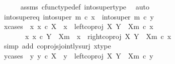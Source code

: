 \begin{isabellebody}
\ \ \ \ \isamarkupfalse%
\ assms\ cfunc{\isacharunderscore}{\kern0pt}type{\isacharunderscore}{\kern0pt}def\ into{\isacharunderscore}{\kern0pt}super{\isacharunderscore}{\kern0pt}type\ \isamarkupfalse%
\ auto\isanewline
\isanewline
\ \ \isamarkupfalse%
\ into{\isacharunderscore}{\kern0pt}super{\isacharunderscore}{\kern0pt}eq{\isacharcolon}{\kern0pt}\ {\isachardoublequoteopen}into{\isacharunderscore}{\kern0pt}super\ m\ {\isasymcirc}\isactrlsub c\ x\ {\isacharequal}{\kern0pt}\ into{\isacharunderscore}{\kern0pt}super\ m\ {\isasymcirc}\isactrlsub c\ y{\isachardoublequoteclose}\isanewline
\isanewline
\ \ \isamarkupfalse%
\ x{\isacharunderscore}{\kern0pt}cases{\isacharcolon}{\kern0pt}\ {\isachardoublequoteopen}{\isacharparenleft}{\kern0pt}{\isasymexists}\ x{\isacharprime}{\kern0pt}{\isachardot}{\kern0pt}\ x{\isacharprime}{\kern0pt}\ {\isasymin}\isactrlsub c\ X\ {\isasymand}\ x\ {\isacharequal}{\kern0pt}\ left{\isacharunderscore}{\kern0pt}coproj\ X\ {\isacharparenleft}{\kern0pt}Y\ {\isasymsetminus}\ {\isacharparenleft}{\kern0pt}X{\isacharcomma}{\kern0pt}m{\isacharparenright}{\kern0pt}{\isacharparenright}{\kern0pt}\ {\isasymcirc}\isactrlsub c\ x{\isacharprime}{\kern0pt}{\isacharparenright}{\kern0pt}\isanewline
\ \ \ \ {\isasymor}\ \ {\isacharparenleft}{\kern0pt}{\isasymexists}\ x{\isacharprime}{\kern0pt}{\isachardot}{\kern0pt}\ x{\isacharprime}{\kern0pt}\ {\isasymin}\isactrlsub c\ Y\ {\isasymsetminus}\ {\isacharparenleft}{\kern0pt}X{\isacharcomma}{\kern0pt}m{\isacharparenright}{\kern0pt}\ {\isasymand}\ x\ {\isacharequal}{\kern0pt}\ right{\isacharunderscore}{\kern0pt}coproj\ X\ {\isacharparenleft}{\kern0pt}Y\ {\isasymsetminus}\ {\isacharparenleft}{\kern0pt}X{\isacharcomma}{\kern0pt}m{\isacharparenright}{\kern0pt}{\isacharparenright}{\kern0pt}\ {\isasymcirc}\isactrlsub c\ x{\isacharprime}{\kern0pt}{\isacharparenright}{\kern0pt}{\isachardoublequoteclose}\isanewline
\ \ \ \ \isamarkupfalse%
\ {\isacharparenleft}{\kern0pt}simp\ add{\isacharcolon}{\kern0pt}\ coprojs{\isacharunderscore}{\kern0pt}jointly{\isacharunderscore}{\kern0pt}surj\ x{\isacharunderscore}{\kern0pt}type{\isacharparenright}{\kern0pt}\isanewline
\isanewline
\ \ \isamarkupfalse%
\ y{\isacharunderscore}{\kern0pt}cases{\isacharcolon}{\kern0pt}\ {\isachardoublequoteopen}{\isacharparenleft}{\kern0pt}{\isasymexists}\ y{\isacharprime}{\kern0pt}{\isachardot}{\kern0pt}\ y{\isacharprime}{\kern0pt}\ {\isasymin}\isactrlsub c\ X\ {\isasymand}\ y\ {\isacharequal}{\kern0pt}\ left{\isacharunderscore}{\kern0pt}coproj\ X\ {\isacharparenleft}{\kern0pt}Y\ {\isasymsetminus}\ {\isacharparenleft}{\kern0pt}X{\isacharcomma}{\kern0pt}m{\isacharparenright}{\kern0pt}{\isacharparenright}{\kern0pt}\ {\isasymcirc}\isactrlsub c\ y{\isacharprime}{\kern0pt}{\isacharparenright}{\kern0pt}\isanewline

\end{isabellebody}
